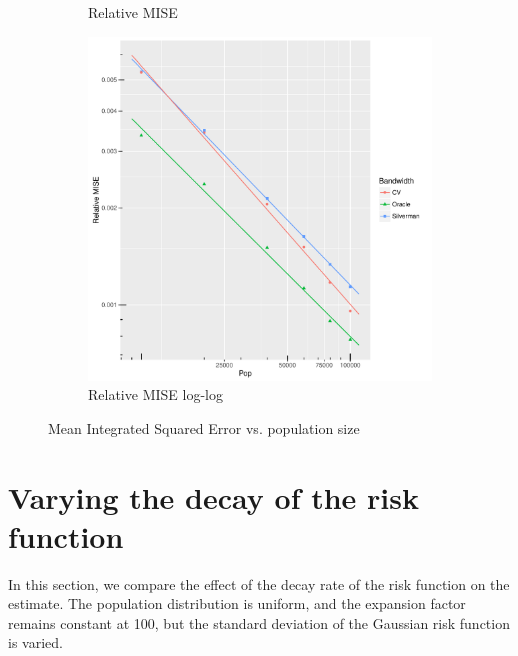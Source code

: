 \begin{figure}[htbp]
\begin{subfigure}[b]{0.3\textwidth}
    \caption{Relative MISE}
    \end{subfigure}
    \begin{subfigure}[b]{0.3\textwidth}
    \includegraphics[width=\textwidth]{results/by_pop_size/RMISE-vs-population-log-log}
    \caption{Relative MISE log-log}
    \end{subfigure}
    \caption[MISE: by population size]{Mean Integrated Squared Error vs. population size}
    \label{fig:ise:unifNpop_1h}
\end{figure}


\section{Varying the decay of the risk function}
\label{sec:results:unif_100_SD}

In this section, we compare the effect of the decay rate of the risk function on the estimate.
The population distribution is uniform, and the expansion factor remains constant at 100, but
the standard deviation of the Gaussian risk function is varied.


